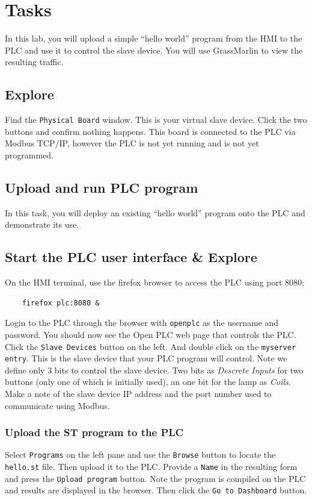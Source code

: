 \section{Tasks}
In this lab, you will upload a simple ``hello world'' program
from the HMI to the PLC and use it to control the slave device.  You will use GrassMarlin to view the resulting traffic.

\subsection{Explore}
Find the {\tt Physical Board} window.  This is your virtual slave device.  Click the two buttons and confirm nothing happens.
This board is connected to the PLC via Modbus TCP/IP, however the PLC is not yet running and is not yet programmed.

\subsection{Upload and run PLC program}
In this task, you will deploy an existing ``hello world'' program onto the PLC and demonstrate its use.

\subsection{Start the PLC user interface \& Explore}
On the HMI terminal, use the firefox browser to access the PLC using port 8080:
\begin{verbatim}
    firefox plc:8080 &
\end{verbatim}
\noindent Login to the PLC through the browser with {\tt openplc} as the username and password.  
You should now see the Open PLC web page that controls the PLC.  Click the {\tt Slave Devices} button
on the left.  And double click on the {\tt myserver entry}.  This is the slave device that your PLC program will control.
Note we define only 3 bits to control the slave device.  Two bits as \textit{Descrete Inputs} for two buttons (only one 
of which is initially used), an one bit for the lamp as \textit{Coils}.
Make a note of the slave device IP address and  the port number used to communicate using Modbus.

\subsubsection{Upload the ST program to the PLC}
Select {\tt Programs} on the left pane and use the
{\tt Browse} button to locate the {\tt hello.st} file.  Then upload it to the PLC.  Provide a {\tt Name} in the resulting form
and press the {\tt Upload program} button.  Note the program is compiled on the PLC and results are displayed in
the browser.  Then click the {\tt Go to Dashboard} button.

